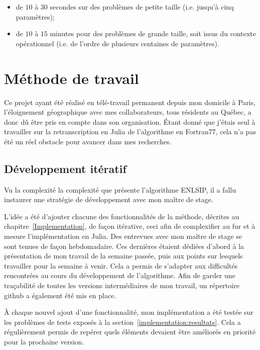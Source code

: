  \begin{itemize}
     \item de $10$ à $30$ secondes sur des problèmes de petite taille (i.e. jusqu'à cinq paramètres);
     \item de $10$ à $15$ minutes pour des problèmes de grande taille, soit issus du contexte opérationnel (i.e. de l'ordre de plusieurs centaines de paramètres).
 \end{itemize}

 \section{M\'ethode de travail}

Ce projet ayant été réalisé en télé-travail permanent depuis mon domicile à Paris, l'éloignement géographique avec mes collaborateurs, 
tous résidents au Québec, a donc d\^u \^etre pris en compte dans son organisation. \'Etant donné que j'étais seul à travailler sur la retranscription 
en Julia de l'algorithme en Fortran77, cela n'a pas été un réel obstacle pour avancer dans mes recherches. 

\subsection*{Développement itératif}

Vu la complexité la complexité que présente l'algorithme ENLSIP, il a fallu instaurer une stratégie de développement avec mon maître de stage.

L'idée a été d'ajouter chacune des fonctionnalités de la méthode, décrites au chapitre~\ref{Implementation}, de façon itérative, ceci afin de complexifier
au fur et à mesure l'implémentation en Julia. Des entrevues avec mon maître de stage se sont tenues de façon hebdomadaire. Ces dernières étaient dédiées d'abord 
à la présentation de mon travail de la semaine passée, puis aux points sur lesquels travailler pour la semaine à venir. Cela a permis de s'adapter aux difficultés
rencontrées au cours du développement de l'algorithme. Afin de garder une traçabilité de toutes les versions intermédiaires de mon travail, un répertoire github
a également été mis en place.

\`A chaque nouvel ajout d'une fonctionnalité, mon implémentation a été testée sur les problèmes de tests exposés à la section~\ref{implementation:resultats}. 
Cela a régulièrement permis de repérer quels éléments devaient être améliorés en priorité pour la prochaine version.

